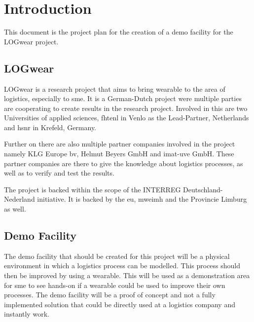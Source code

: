 \chapter{Introduction}
This document is the project plan for the creation of a demo facility for the LOGwear project.

\section{LOGwear}

\noindent LOGwear is a research project that aims to bring wearable to the area of logistics, especially to \gls{sme}. It is a German-Dutch project were multiple parties are cooperating to create results in the research project. Involved in this are two Universities of applied sciences, \gls{fhtenl} in Venlo as the Lead-Partner, Netherlands and \gls{hsnr} in Krefeld, Germany.

Further on there are also multiple partner companies involved in the project namely KLG Europe bv, Helmut Beyers GmbH and imat-uve GmbH. These partner companies are there to give the knowledge about logistics processes, as well as to verify and test the results.

The project is backed within the scope of the INTERREG Deutschland-Nederland initiative. It is backed by the \gls{eu}, \gls{mweimh} and the Provincie Limburg as well.



\section{Demo Facility}
The demo facility that should be created for this project will be a physical environment in which a logistics process can be modelled. This process should then be improved by using a wearable. This will be used as a demonstration area for \gls{sme} to see hands-on if a wearable could be used to improve their own processes. The demo facility will be a proof of concept and not a fully implemented solution that could be directly used at a logistics company and instantly work.


